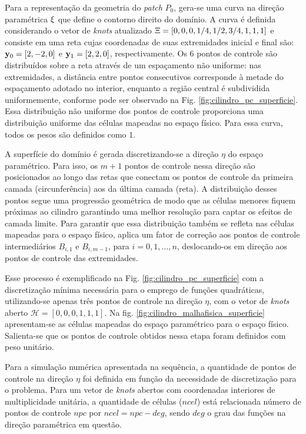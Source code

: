 \documentclass[tese_patricia]{subfiles}
\begin{document}
Para a representação da geometria do \textit{patch} $P_0$, gera-se uma curva na direção paramétrica $\xi$ que define o contorno direito do domínio. A curva é definida considerando o vetor de \textit{knots} atualizado $\Xi=\left[0,0,0,1/4,1/2,3/4,1,1,1\right]$ e  consiste em uma reta cujas coordenadas de suas extremidades inicial e final são: $\mathbf{y}_0 =[2,-2,0]$ e $\mathbf{y}_1 =[2, 2 ,0]$, respectivamente. Os $6$ pontos de controle são distribuídos sobre a reta através de um espaçamento não uniforme: nas extremidades, a distância entre pontos consecutivos corresponde à metade do espaçamento adotado no interior, enquanto a região central é subdividida uniformemente, conforme pode ser observado na Fig. \ref{fig:cilindro_pc_superficie}. Essa distribuição não uniforme dos pontos de controle proporciona uma distribuição uniforme das células mapeadas no espaço físico. Para essa curva, todos os pesos são definidos como $1$.

A superfície do domínio é gerada discretizando-se a direção $\eta$ do espaço paramétrico. Para isso, os $m+1$ pontos de controle nessa direção são posicionados ao longo das retas que conectam os pontos de controle da primeira camada (circunferência) aos da última camada (reta). A distribuição desses pontos segue uma progressão geométrica de modo que as células menores fiquem próximas ao cilindro garantindo uma melhor resolução para captar os efeitos de camada limite. Para garantir que essa distribuição também se refleta nas células mapeadas para o espaço físico, aplica um fator de correção aos pontos de controle intermediários $B_{i,1}$ e $B_{i,m-1}$, para $i = 0, 1, \dots , n$, deslocando-os em direção aos pontos de controle das extremidades.

Esse processo é exemplificado na Fig. \ref{fig:cilindro_pc_superficie} com a discretização mínima necessária para o emprego de funções quadráticas, utilizando-se apenas três pontos de controle na direção $\eta$, com o vetor de \textit{knots} aberto $\mathcal{H}=[0,0,0,1,1,1]$. Na fig. \ref{fig:cilindro_malhafisica_superficie} apresentam-se as células mapeadas do espaço paramétrico para o espaço físico. Salienta-se que os pontos de controle obtidos nessa etapa foram definidos com peso unitário.

Para a simulação numérica apresentada na sequência, a quantidade de pontos de controle na direção $\eta$ foi definida em função da necessidade de discretização para o problema. Para um vetor de \textit{knots} abertos com coordenadas interiores de multiplicidade unitária, a quantidade de células ($ncel$) está relacionada número de pontos de controle $npc$ por $ncel = npc-deg$,  sendo $deg$ o grau das funções na direção paramétrica em questão.
\end{document}

